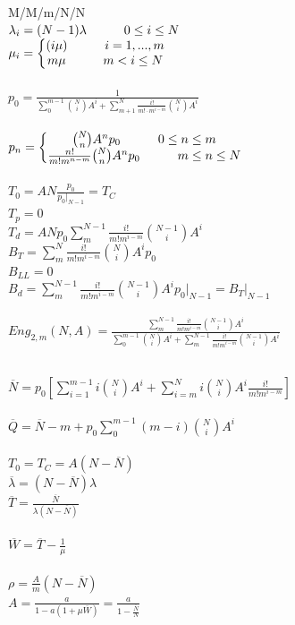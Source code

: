 \begin{minipage}{.22\textwidth}
	M/M/m/N/N \\
	$\lambda_i=(N-1)\lambda \hskip 3em 0\le{i}\le{N}$ \\
	$\mu_i = \left \{  \begin{matrix} (i\mu) \hskip 3em  i=1,...,m \\
			m\mu \hskip 3em m<i\le{N}\end{matrix}  \right .$ \\ \\
	$p_0=\frac{1}{\sum_0^{m-1}\binom{N}{i}A^i+\sum_{m+1}^N\frac{i!}{m!\cdot{m^{i-m}}}{\binom{N}{i}A^i}}$ \\ \\
	$p_n = \left \{  \begin{matrix} \binom{N}{n}A^n{p_0} \hskip 3em  0 \le {n} \le {m} \\
			\frac{n!}{m!m^{n-m}}\binom{N}{n}A^n{p_0} \hskip 3em m\le{n}\le{N}\end{matrix}  \right .$ \\ \\
	$T_0=AN\frac{p_0}{p_0|_{N-1}}=T_C$ \\
	$T_p=0$ \\
	$T_d=ANp_0\sum\limits_m^{N-1}\frac{i!}{m!{m^{i-m}}}\binom{N-1}{i}A^i$ \\
	$B_T=\sum\limits_m^{N}\frac{i!}{m!{m^{i-m}}}\binom{N}{i}A^i{p_0}$ \\
	$B_{LL}=0$ \\
	$B_d=\sum\limits_m^{N-1}\frac{i!}{m!{m^{i-m}}}\binom{N-1}{i}A^i{p_0|_{N-1}}=B_T|_{N-1}$\\ \\
	$Eng_{2,m}(N,A)=\frac{\sum\limits_m^{N-1}\frac{i!}{m!{m^{i-m}}}\binom{N-1}{i}A^i}{\sum\limits_0^{m-1}\binom{N}{i}A^i +\sum\limits_m^{N-1}\frac{i!}{m!{m^{i-m}}}\binom{N-1}{i}A^i}$ \\ \\
\end{minipage}
\vfill\null
\columnbreak
\begin{minipage}{.22\textwidth}
	$\overline{N}=p_0[\sum\limits_{i=1}^{m-1}{i}\binom{N}{i}A^i+\sum\limits_{i=m}^{N}{i}\binom{N}{i}A^i\frac{i!}{m!{m^{i-m}}}]$ \\ \\
	$\overline{Q}=\overline{N}-m+p_0\sum\limits_{0}^{m-1}(m-i)\binom{N}{i}A^i$ \\ \\
	$T_0=T_C=A(N-\overline{N})$ \\
	$\overline{\lambda}=(N-\overline{N})\lambda$ \\
	$\overline{T}=\frac{\overline{N}}{\lambda{(N-\overline{N})}}$ \\ \\
	$\overline{W}=\overline{T}-\frac{1}{\mu}$ \\ \\
	$\rho=\frac{A}{m}(N-\overline{N})$ \\
	$A=\frac{a}{1-a(1+\mu\overline{W})}=\frac{a}{1-\frac{\overline{N}}{N}}$ \\ \\
\end{minipage}


